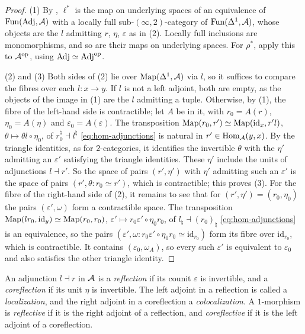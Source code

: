 \begin{proof}
%
(1) By \cite[Thm.~5.1]{abellan2026bifibrations}, $\ell^{*}$ is the map on
underlying spaces of an equivalence of $\operatorname{Fun}(\mathrm{Adj},\mathcal{A})$ with a locally full
sub-$(\infty,2)$-category of $\operatorname{Fun}(\Delta^{1},\mathcal{A})$, whose objects are the $l$
admitting $r$, $\eta$, $\varepsilon$ as in (2). Locally full inclusions are
monomorphisms, and so are their maps on underlying spaces. For $\rho^{*}$, apply
this to $\mathcal{A}^{\mathrm{op}}$, using
$\mathrm{Adj} \simeq \mathrm{Adj}^{\mathrm{op}}$.

(2) and (3) Both sides of (2) lie over
$\operatorname{Map}(\Delta^{1},\mathcal{A})$
via $l$, so it suffices to compare the fibres over each
$l\colon x \to y$.
If $l$ is not a left adjoint, both are empty, as the objects of the image in
(1) are the $l$ admitting a tuple. Otherwise, by (1), the fibre of the left-hand
side is contractible; let $A$ be in it, with $r_{0} = A(r)$,
$\eta_{0} = A(\eta)$
and
$\varepsilon_{0} = A(\varepsilon)$.
The transposition
$\operatorname{Map}(r_{0},r') \simeq \operatorname{Map}(\mathrm{id}_{x},r'l)$,
$\theta \mapsto \theta l \circ \eta_{0}$,
of
$r_{0}^{\natural} \dashv l^{\natural}$
\eqref{eq:hom-adjunctions} is natural in
$r' \in \operatorname{Hom}_{\mathcal{A}}(y,x)$.
By the triangle identities, as for $2$-categories, it identifies the invertible
$\theta$ with the $\eta'$ admitting an $\varepsilon'$ satisfying the triangle
identities.
These $\eta'$ include the units of adjunctions
$l \dashv r'$. So the space of pairs $(r',\eta')$ with $\eta'$ admitting such
an $\varepsilon'$ is the space of pairs
$(r',\theta\colon r_{0} \simeq r')$,
which is contractible; this proves (3).
For the fibre of the right-hand side of (2), it remains to see that for
$(r',\eta') = (r_{0},\eta_{0})$
the pairs
$(\varepsilon',\omega)$
form a contractible space. The transposition
$\operatorname{Map}(lr_{0},\mathrm{id}_{y}) \simeq \operatorname{Map}(r_{0},r_{0})$,
$\varepsilon' \mapsto r_{0}\varepsilon' \circ \eta_{0}r_{0}$,
of
$l_{\natural} \dashv (r_{0})_{\natural}$
\eqref{eq:hom-adjunctions} is an equivalence, so the pairs
$(\varepsilon',\omega\colon r_{0}\varepsilon' \circ \eta_{0}r_{0} \simeq
\mathrm{id}_{r_{0}})$
form its fibre over $\mathrm{id}_{r_{0}}$, which is contractible. It contains
$(\varepsilon_{0},\omega_{A})$,
so every such $\varepsilon'$ is equivalent to
$\varepsilon_{0}$ and also satisfies the other triangle identity.
\end{proof}

\begin{defi}
\label{def:reflection}
%
An adjunction $l \dashv r$ in $\mathcal{A}$ is a \emph{reflection} if its counit
$\varepsilon$ is invertible, and a \emph{coreflection} if its unit $\eta$ is
invertible.
The left adjoint in a reflection is called a \emph{localization},
and the right adjoint in a coreflection a \emph{colocalization}.
A $1$-morphism is \emph{reflective} if it is the right adjoint of a reflection,
and \emph{coreflective} if it is the left adjoint of a coreflection.
\end{defi}

